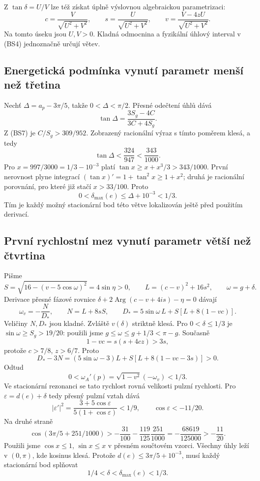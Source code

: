 \documentclass[11pt,a4paper]{article}
\theoremstyle{remark}\newtheorem{remark}[theorem]{Poznámka}
\numberwithin{equation}{section}
\begin{document}
Z \(\tan\delta=U/V\) lze též získat úplně výslovnou algebraickou
parametrizaci:
\[
c=\frac{V}{\sqrt{U^2+V^2}},\qquad
s=\frac{U}{\sqrt{U^2+V^2}},\qquad
v=\frac{V-4zU}{\sqrt{U^2+V^2}}.
\tag{BS10}
\]
Na tomto úseku jsou \(U,V>0\). Kladná odmocnina a fyzikální
úhlový interval v (BS4) jednoznačně určují větev.

\subsection{Energetická podmínka vynutí parametr menší než třetina}

Nechť \(\Delta=a_p-3\pi/5\), takže \(0<\Delta<\pi/2\).
Přesné odečtení úhlů dává
\[
\tan\Delta=\frac{3S_g-4C}{3C+4S_g}.
\]
Z (BS7) je \(C/S_g>309/952\). Zobrazený racionální výraz s tímto
poměrem klesá, a tedy
\[
\tan\Delta<\frac{324}{947}<\frac{343}{1000}.
\]
Pro \(x=997/3000=1/3-10^{-3}\) platí
\(\tan x\ge x+x^3/3>343/1000\). První nerovnost plyne integrací
\((\tan x)'=1+\tan^2x\ge1+x^2\); druhá je racionální porovnání,
pro které již stačí \(x>33/100\). Proto
\[
\boxed{0<\delta_{\max}(e)\le\Delta+10^{-3}<1/3.}
\tag{BS11}
\]
Tím je každý možný stacionární bod této větve lokalizován ještě před
použitím derivací.

\subsection{První rychlostní mez vynutí parametr větší než čtvrtina}

Pišme
\[
S=\sqrt{16-(v-5\cos\omega)^2}=4\sin\eta>0,
\qquad L=(c-v)^2+16s^2,
\qquad \omega=g+\delta.
\]
Derivace přesné fázové rovnice
\(\delta+2\operatorname{Arg}(c-v+4is)-\eta=0\) dávají
\[
\omega_v=-\frac{N}{D_*},\qquad N=L+8sS,
\qquad D_*=5\sin\omega\,L+S[L+8(1-vc)].
\tag{BS12}
\]
Veličiny \(N,D_*\) jsou kladné. Zvláště \(v(\delta)\) striktně
klesá. Pro \(0<\delta\le1/3\) je
\(\sin\omega\ge S_g>19/20\): použili jsme
\(g\le\omega\le g+1/3<\pi-g\). Současně
\[
1-vc=s(s+4cz)>3s,
\]
protože \(c>7/8\), \(z>6/7\). Proto
\[
D_*-3N=(5\sin\omega-3)L+S[L+8(1-vc-3s)]>0.
\]
Odtud
\[
0<\omega_A'(p)=\sqrt{1-v^2}(-\omega_v)<1/3.
\tag{BS13}
\]
Ve stacionární rezonanci se tato rychlost rovná velikosti pulzní
rychlosti. Pro \(\varepsilon=d(e)+\delta\) tedy přesný pulzní vztah
dává
\[
|\varepsilon'|^2=
\frac{3+5\cos\varepsilon}{5(1+\cos\varepsilon)}<1/9,
\qquad \cos\varepsilon<-11/20.
\]
Na druhé straně
\[
\cos(3\pi/5+251/1000)
>-\frac{31}{100}-\frac{119}{125}\frac{251}{1000}
=-\frac{68619}{125000}>-\frac{11}{20}.
\]
Použili jsme \(\cos x\le1\), \(\sin x\le x\) v přesném součtovém
vzorci. Všechny úhly leží v \((0,\pi)\), kde kosinus klesá.
Protože \(d(e)\le3\pi/5+10^{-3}\), musí každý stacionární bod
splňovat
\[
\boxed{1/4<\delta<\delta_{\max}(e)<1/3.}
\tag{BS14}
\]
\end{document}
